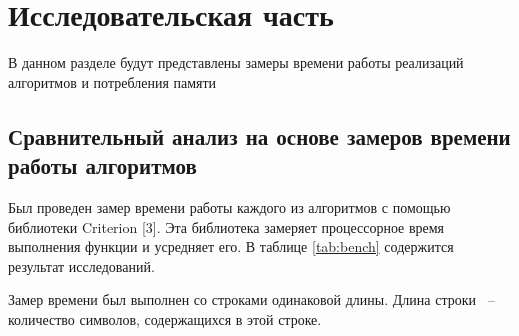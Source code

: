 \documentclass[12pt]{report}
\begin{document}
	\chapter{Исследовательская часть}
	В данном разделе будут представлены замеры времени работы реализаций алгоритмов и потребления памяти
	
	\section{Сравнительный анализ на основе замеров времени работы алгоритмов}
	
	Был проведен замер времени работы каждого из алгоритмов с помощью библиотеки Criterion [3]. Эта библиотека замеряет процессорное время выполнения функции и усредняет его. В таблице \ref{tab:bench} содержится результат исследований.

	Замер времени был выполнен со строками одинаковой длины. Длина строки ~--~ количество символов, содержащихся в этой строке.
	
\end{document}
